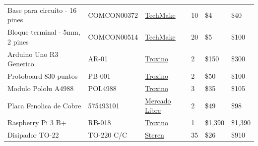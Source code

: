 \documentclass{article}
\begin{document}
\begin{titlingpage}
\begin {table}[H]
\begin{tabular}{llllll}
    \phantom{ZZ}Base para circuito - 16 pines  &   COMCON00372  &  \href{http://www.techmake.com/00372.html} {TechMake}  & 10 & \$4 & \$40 \\
    \phantom{ZZ}Bloque terminal - 5mm, 2 pines  &   COMCON00514  &  \href{http://www.techmake.com/00514.html} {TechMake}  & 20 & \$5 & \$100 \\
    \phantom{ZZ}Arduino Uno R3 Generico &   AR-01  &  \href{https://troxino.com/producto/arduino-uno-r3-generico/1} {Troxino}  & 2 & \$150 & \$300 \\
    \phantom{ZZ}Protoboard 830 puntos &   PB-001  &  \href{https://troxino.com/producto/protoboard-830-puntos/24} {Troxino}  & 2 & \$50 & \$100 \\
    \phantom{ZZ}Modulo Pololu A4988 &   POL4988  &  \href{https://troxino.com/producto/modulo-pololu-a4988/109} {Troxino}  & 3 & \$35 & \$105 \\
    \phantom{ZZ}Placa Fenolica de Cobre &   575493101  & \href{https://articulo.mercadolibre.com.mx/MLM-575493101-placa-fenolica-de-cobre-doble-cara-10x15-2-pzas-_JM} {Mercado Libre}  & 2 & \$49 & \$98 \\
    \phantom{ZZ}Raspberry Pi 3 B+ &   RB-018  & \href{https://troxino.com/producto/raspberry-pi-3-b-2018/251} {Troxino}  & 1 & \$1,390 & \$1,390 \\
    \phantom{ZZ}Disipador TO-22 &   TO-220 C/C  & \href{http://www.steren.com.mx/disipador-electronico-para-to-22.html} {Steren}  & 35 & \$26 & \$910 \\
    

\end{tabular}
\end{table}
\end{titlingpage}
\end{document}
